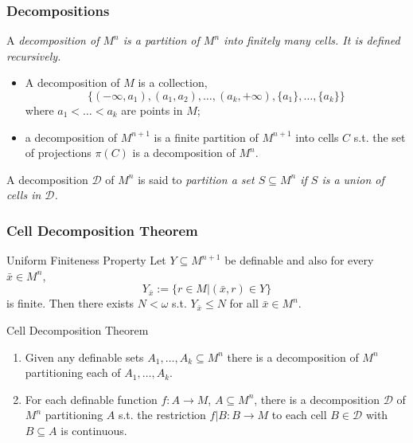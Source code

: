 \begin{frame}[c]\frametitle{Decompositions}
    
	A \em decomposition \em of $M^n$ is a partition of $M^n$ into finitely many cells. It is defined recursively.

	\begin{itemize}
		\item A decomposition of $M$ is a collection,
		$$\{  (-\infty,a_1),(a_1,a_2),\ldots,(a_k,+\infty),\{a_1\},\ldots,\{a_k\} \}$$
		where $a_1<\ldots<a_k$ are points in $M$;
		\item a decomposition of $M^{n+1}$ is a finite partition of $M^{n+1}$ into cells $C$ s.t. the set of projections $\pi(C)$ is a decomposition of $M^n$.
	\end{itemize}

	A decomposition $\mathcal{D}$ of $M^n$ is said to \em partition \em a set $S \subseteq M^n$ if $S$ is a union of cells in $\mathcal{D}$.

\end{frame}

\begin{frame}[c]\frametitle{Cell Decomposition Theorem}
    
	\begin{beamerboxesrounded}[shadow=true]{Uniform Finiteness Property}
		Let $Y \subseteq M^{n+1}$ be definable and also for every $\bar{x} \in M^n$, 
		$$Y_{\bar{x}}:= \{  r \in M | (\bar{x},r) \in Y \}$$ is finite.
		Then there exists $N<\omega$ s.t. $Y_{\bar{x}} \leq N$ for all $\bar{x} \in M^n$.
	\end{beamerboxesrounded}

	\begin{beamerboxesrounded}[shadow=true]{Cell Decomposition Theorem}
		\begin{enumerate}
			\item Given any definable sets $A_1,\ldots,A_k\subseteq M^n$ there is a decomposition of $M^n$ partitioning each of $A_1,\ldots,A_k$.
			\item For each definable function $f:A \to M$, $A \subseteq M^n$, there is a decomposition $\mathcal{D}$ of $M^n$ partitioning $A$ s.t. the restriction $f|B:B\to M$ to each cell $B \in \mathcal{D}$ with $B\subseteq A$ is continuous.
		\end{enumerate}
	\end{beamerboxesrounded}

\end{frame}

